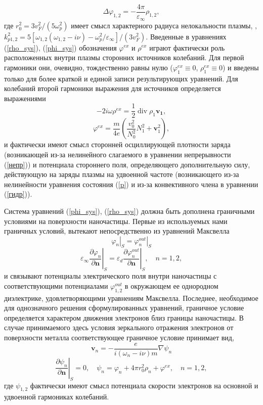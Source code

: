 \documentclass[12pt, a4paper]{article}
\renewcommand{\vec}{\mathbf}
\def \eps {\varepsilon}
\def \w {\omega}
\def \ph {\varphi}
\newcommand{\dn}[1]{\left.\frac{\partial #1}{\partial \vec{n}}\right|_{ S}}
\begin{document}
\begin{equation} 
	\label{phi_sys}
 \Delta \ph_{1,2} = - \frac{4 \pi}{\eps_\infty} \rho_{1,2},
\end{equation}
где $r_0^2 = 3v_F^2/(5\w_p^2)$ имеет смысл характерного радиуса нелокальности плазмы, , $k_{p1,2}^2 = {5[\w_{1,2}(\w_{1,2} - i\nu) - \w_p^2/\eps_\infty]/(3v_F^2)} $. Введенные в уравнениях (\ref{rho_sys}), (\ref{phi_sys}) обозначения $\ph^{ex}$ и $\rho^{ex}$ играют фактически роль расположенных внутри плазмы сторонних источников колебаний. Для первой гармоники они, очевидно, тождественно равны нулю ($\ph^{ex}_1\equiv0$, $\rho^{ex}_1\equiv0$) и введены только для более краткой и единой записи результирующих уравнений. Для колебаний второй гармоники выражения для источников определяется выражениями 
\begin{equation}
	\label{rho_ex}
 - 2i\w \rho^{ex} = \frac{1}{2}\operatorname{div} \rho_1 \vec{v_1},
\end{equation}
\begin{equation}
	\label{phi_ex}
\ph^{ex} = \frac{m}{4e}\left(\frac{v_0^2}{N_0^2}N_1^2 + \vec{v}_1^2\right),
\end{equation}
и фактически имеют смысл сторонней осциллирующей плотности заряда (возникающей из-за нелинейного слагаемого в уравнении непрерывности (\ref{непр})) и потенциала стороннего поля, определяющего дополнительную силу, действующую на заряды плазмы на удвоенной частоте (возникающего из-за нелинейности уравнения состояния (\ref{p}) и из-за конвективного члена в уравнении (\ref{гидр})). 

Система уравнений (\ref{phi_sys}), (\ref{rho_sys}) должна быть дополнена граничными условиями на поверхности наночастицы. Первые из используемых нами граничных условий, вытекают непосредственно из уравнений Максвелла
\begin{equation} 
	\left. \ph_n \right|_{ S} = \left. \ph_n^{out} \right|_{ S} 
\end{equation}
\begin{equation} 
	\eps_\infty \dn{\ph_n} = \eps_d \dn{\ph_n^{out}}, \quad n = 1,2,  
\end{equation}
и связывают потенциалы электрического поля внутри наночастицы с соответствующими потенциалами $\ph_{1,2}^{out}$ в окружающем ее однородном диэлектрике, удовлетворяющими уравнениям Максвелла.
Последнее, необходимое для однозначного решения сформулированных уравнений, граничное условие определяется характером движения электронов близ границы наночастицы. В случае принимаемого здесь условия зеркального отражения электронов от поверхности металла соответствующее граничное условие принимает вид, 
\begin{equation} 
	\label{v}
\vec{v}_n = -\frac{e}{i(\w_n - i\nu)m} \nabla \psi_n
\end{equation}
\begin{equation} 
	\label{psi}
\dn{\psi_n}	= 0, \quad \psi_n = \ph_n + 4 \pi r_0^2 \rho_n + \ph^{ex}, \quad n = 1,2,  
\end{equation}
где $\psi_{1,2}$ фактически имеют смысл потенциала скорости электронов на основной и удвоенной гармониках колебаний.
\end{document}

